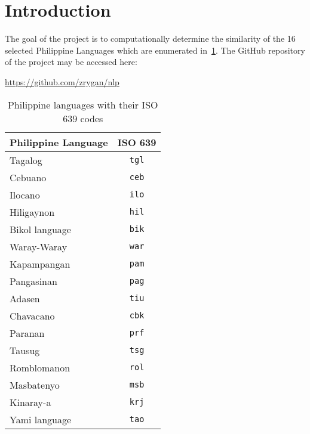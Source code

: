 \section{Introduction}

The goal of the project is to computationally determine the similarity of the
16 selected Philippine Languages which are enumerated
in~\cref{tab:ph_languages}. The GitHub repository of the project may be
accessed here:
\begin{center}
    \url{https://github.com/zrygan/nlp}
\end{center}

\begin{table}[h!]
    \centering
    \begin{tabular}{lc}
        \hline
        \textbf{Philippine Language} & \textbf{ISO 639} \\
        \hline
        Tagalog                      & \texttt{tgl}     \\
        Cebuano                      & \texttt{ceb}     \\
        Ilocano                      & \texttt{ilo}     \\
        Hiligaynon                   & \texttt{hil}     \\
        Bikol language~\footnotemark & \texttt{bik}     \\
        Waray-Waray                  & \texttt{war}     \\
        Kapampangan                  & \texttt{pam}     \\
        Pangasinan                   & \texttt{pag}     \\
        Adasen                       & \texttt{tiu}     \\
        Chavacano                    & \texttt{cbk}     \\
        Paranan                      & \texttt{prf}     \\
        Tausug                       & \texttt{tsg}     \\
        Romblomanon                  & \texttt{rol}     \\
        Masbatenyo                   & \texttt{msb}     \\
        Kinaray-a                    & \texttt{krj}     \\
        Yami language                & \texttt{tao}     \\
        \hline
    \end{tabular}
    \caption{Philippine languages with their ISO 639 codes}\label{tab:ph_languages}
\end{table}

